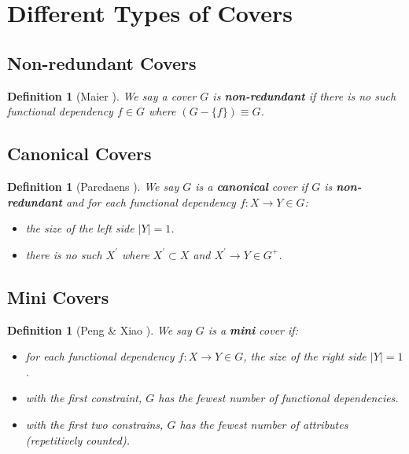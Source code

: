 \documentclass[11pt]{book}
\newtheorem{mydef}[thm]{Definition}
\begin{document}
\section{Different Types of Covers}

\subsection{Non-redundant Covers}

\begin{mydef}[Maier \cite{maier1980minimum}]
We say a cover $G$ is \textbf{non-redundant} if there is no such functional dependency $f \in G$ where $(G - \{f\}) \equiv G$.
\end{mydef}

\subsection{Canonical Covers}

\begin{mydef}[Paredaens \cite{paredaens1977functional}]
We say $G$ is a \textbf{canonical} cover if $G$ is \textbf{non-redundant} and for each functional dependency $f: X \rightarrow Y \in G$:
  \begin{itemize}
	\item the size of the left side $\lvert Y \rvert = 1$.
	\item there is no such $X^{'}$ where $X^{'} \subset X$ and $X^{'} \rightarrow Y \in G^{+}$.
  \end{itemize}
\end{mydef}

\subsection{Mini Covers}

\begin{mydef}[Peng \& Xiao \cite{peng2016optimal}]
We say $G$ is a \textbf{mini} cover if:
  \begin{itemize}
  	\item for each functional dependency $f: X \rightarrow Y \in G$, the size of the right side $\lvert Y \rvert = 1$.
  	\item with the first constraint, $G$ has the fewest number of functional dependencies.
  	\item with the first two constrains, $G$ has the fewest number of attributes (repetitively counted).
  \end{itemize}
\end{mydef}
\end{document}

